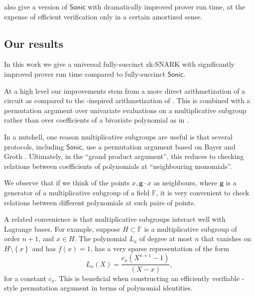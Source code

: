 \documentclass[11pt]{article} %
\newcommand{\F}{\ensuremath{\mathbb F}\xspace}
\newcommand{\sonic}{\ensuremath{\mathsf{Sonic}}\xspace}
\newcommand{\set}[1]{\ensuremath{\left\{#1\right\}}\xspace}
\newcommand{\hgen}{\ensuremath{\mathbf{g}}\xspace}
\begin{document}
\cite{sonic} also give a version of \sonic with dramatically improved prover run time, at the expense of efficient verification only in a certain amortized sense.

\subsection{Our results}
In this work we give a universal fully-succinct zk-SNARK with significantly improved prover run time compared to fully-succinct \sonic.

At a high level our improvements stem from a more direct arithmetization of a circuit as compared to the \cite{Bootle}-inspired arithmetization of \cite{sonic}. This is combined with a permutation argument over univariate evaluations on a multiplicative subgroup rather than over coefficients of a bivariate polynomial as in \cite{sonic}.

In a nutshell, one reason multiplicative subgroups are useful is that several protocols, including \sonic,  use a permutation argument based on Bayer and Groth \cite{permorig}. Ultimately, in the ``grand product argument'', this reduces to checking relations between coefficients of polynomials at ``neighbouring monomials''.

We observe that if we think of the points $x,\hgen\cdot x$ as neighbours, where \hgen is a generator of a multiplicative subgroup of a field \F, it is very convenient to check relations between different polynomials at such pairs of points.

A related convenience is that multiplicative subgroups interact well with Lagrange bases.
For example, suppose  $H\subset \F$ is a multiplicative subgroup of order $n+1$, and $x\in H$.  The polynomial $L_x$ of degree at most $n$  that vanishes on $H\setminus\set{x}$ and has $f(x)=1$, has a very sparse representation of the form
\[L_x(X)= \frac{c_x(X^{n+1}-1)}{(X-x)},\]
for a constant $c_x$.
This is beneficial when constructing an efficiently verifiable \cite{permorig}-style permutation argument in terms of polynomial identities.
\end{document}
